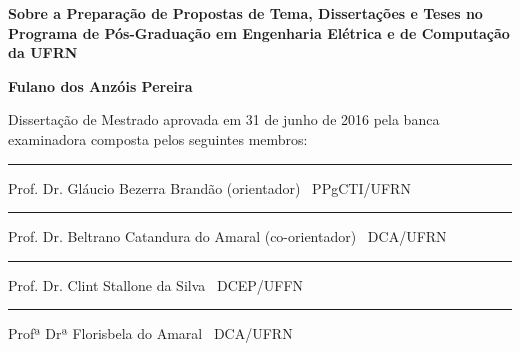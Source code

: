 %
%

\begin{titlepage}

\begin{center}

\LARGE

\textbf{Sobre a Preparação de Propostas de Tema, Dissertações
e Teses no Programa de Pós-Graduação em Engenharia Elétrica e de Computação da UFRN}

\vfill

\Large

\textbf{Fulano dos Anzóis Pereira}

\end{center}

\vfill

\noindent
Dissertação de Mestrado
aprovada em 31 de junho de 2016 pela banca examinadora composta
pelos seguintes membros:


\begin{center}

\vspace{1.5cm}\rule{0.95\linewidth}{1pt}
\parbox{0.9\linewidth}{%
Prof. Dr. Gláucio Bezerra Brandão (orientador) \dotfill\ PPgCTI/UFRN}

\vspace{1.5cm}\rule{0.95\linewidth}{1pt}
\parbox{0.9\linewidth}{%
Prof. Dr. Beltrano Catandura do Amaral (co-orientador) \dotfill\ DCA/UFRN}

\vspace{1.5cm}\rule{0.95\linewidth}{1pt}
\parbox{0.9\linewidth}{%
Prof. Dr. Clint Stallone da Silva \dotfill\ DCEP/UFFN}

\vspace{1.5cm}\rule{0.95\linewidth}{1pt}
\parbox{0.9\linewidth}{%
Profª Drª Florisbela do Amaral \dotfill\ DCA/UFRN}

\end{center}

\end{titlepage}

